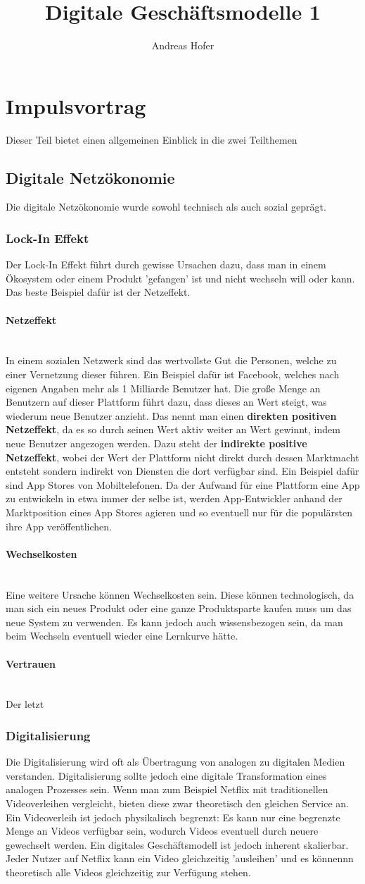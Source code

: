 \documentclass{article}
\title{\vspace{-1cm}Digitale Geschäftsmodelle 1}
\author{Andreas Hofer}
\newcommand{\paragraphlb}[1]{\paragraph{#1}\mbox{}\\}
\begin{document}
	\maketitle
	\tableofcontents
	\section{Impulsvortrag}
	Dieser Teil bietet einen allgemeinen Einblick in die zwei Teilthemen
	\subsection{Digitale Netzökonomie}
	Die digitale Netzökonomie wurde sowohl technisch als auch sozial geprägt.
	\subsubsection{Lock-In Effekt}
	Der Lock-In Effekt führt durch gewisse Ursachen dazu, dass man in einem Ökosystem oder einem Produkt 'gefangen' ist und nicht wechseln will oder kann. Das beste Beispiel dafür ist der Netzeffekt.
	\paragraphlb{Netzeffekt}
	In einem sozialen Netzwerk sind das wertvollste Gut die Personen, welche zu einer Vernetzung dieser führen. Ein Beispiel dafür ist Facebook, welches nach eigenen Angaben mehr als 1 Milliarde Benutzer hat. Die große Menge an Benutzern auf dieser Plattform führt dazu, dass dieses an Wert steigt, was wiederum neue Benutzer anzieht. Das nennt man einen \textbf{direkten positiven Netzeffekt}, da es so durch seinen Wert aktiv weiter an Wert gewinnt, indem neue Benutzer angezogen werden. Dazu steht der \textbf{indirekte positive Netzeffekt}, wobei der Wert der Plattform nicht direkt durch dessen Marktmacht entsteht sondern indirekt von Diensten die dort verfügbar sind. Ein Beispiel dafür sind App Stores von Mobiltelefonen. Da der Aufwand für eine Plattform eine App zu entwickeln in etwa immer der selbe ist, werden App-Entwickler anhand der Marktposition eines App Stores agieren und so eventuell nur für die populärsten ihre App veröffentlichen.
	\paragraphlb{Wechselkosten}
	Eine weitere Ursache können Wechselkosten sein. Diese können technologisch, da man sich ein neues Produkt oder eine ganze Produktsparte kaufen muss um das neue System zu verwenden. Es kann jedoch auch wissensbezogen sein, da man beim Wechseln eventuell wieder eine Lernkurve hätte.
	\paragraphlb{Vertrauen}
	Der letzt
	\subsubsection{Digitalisierung}
	Die Digitalisierung wird oft als Übertragung von analogen zu digitalen Medien verstanden. Digitalisierung sollte jedoch eine digitale Transformation eines analogen Prozesses sein. Wenn man zum Beispiel Netflix mit traditionellen Videoverleihen vergleicht, bieten diese zwar theoretisch den gleichen Service an. Ein Videoverleih ist jedoch physikalisch begrenzt: Es kann nur eine begrenzte Menge an Videos verfügbar sein, wodurch Videos eventuell durch neuere gewechselt werden. Ein digitales Geschäftsmodell ist jedoch inherent skalierbar. Jeder Nutzer auf Netflix kann ein Video gleichzeitig 'ausleihen' und es könnennn theoretisch alle Videos gleichzeitig zur Verfügung stehen.
\end{document}
